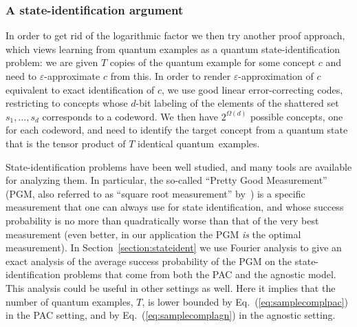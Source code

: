 \documentclass[twoside,11pt]{article}
\newcommand{\eps}{\varepsilon}
\begin{document}
\subsubsection{A state-identification argument}

In order to get rid of the logarithmic factor we then try another proof approach, which views learning from quantum examples as a quantum state-identification problem: we are given $T$ copies of the quantum example for some concept $c$ and need to $\eps$-approximate $c$ from this.
In order to render $\eps$-approximation of $c$ equivalent to exact identification of $c$, we use good linear error-correcting codes, restricting to concepts whose $d$-bit labeling of the elements of the shattered set $s_1,\ldots,s_d$ corresponds to a codeword.
We then have $2^{\Omega(d)}$ possible concepts, one for each codeword, and need to identify the target concept from a quantum state that is the tensor product of $T$ identical quantum~examples. 

State-identification problems have been well studied, and many tools are available for analyzing them.  In particular, the so-called ``Pretty Good Measurement'' (PGM, also referred to as ``square root measurement'' by~\cite{eldar&forney:squarerootmeasurement}) is a specific measurement that one can always use for state identification, and whose success probability is no more than quadratically worse than that of the very best measurement
(even better, in our application the PGM \emph{is} the optimal measurement). 
In Section~\ref{section:stateident} we use Fourier analysis to give an exact analysis of the average success probability of the PGM on the state-identification problems that come from both the PAC and the agnostic model. This analysis could be useful in other settings as well. Here it implies that the number of quantum examples, $T$, is lower bounded by Eq.~(\ref{eq:samplecomplpac}) in the PAC setting, and by Eq.~(\ref{eq:samplecomplagn}) in the agnostic setting.
\end{document}
